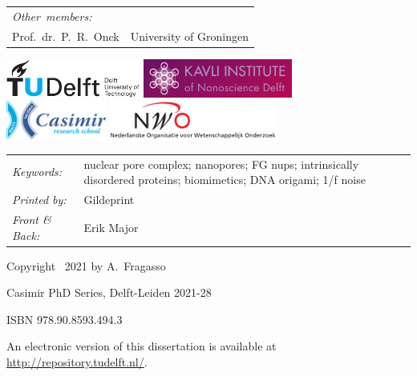 \begin{titlepage}
\begin{tabular}{p{5cm}l}
    \medskip
    \mbox{\emph{Other members:}} & \\
    Prof.\ dr.\ P.\ R.\ Onck & University of Groningen \\
\end{tabular}

\medskip


\vfill
\begin{center}
    \includegraphics[height=0.5in]{title/logos/tudelft}
    \hspace{2em}
    \includegraphics[height=0.5in]{title/logos/kavli_logo_300_dpi} \\[1pt]
    \includegraphics[height=0.5in]{title/logos/casimir}
    \hspace{3.8em}
    \includegraphics[height=0.5in]{title/logos/nwo}
\end{center}
\vfill

\noindent
\begin{tabular}{@{}p{}@{}p{}}
    \textit{Keywords:} & nuclear pore complex; nanopores; FG nups; intrinsically disordered proteins; biomimetics; DNA origami; 1/f noise \\[\medskipamount]
    \textit{Printed by:} & Gildeprint \\[\medskipamount]
    \textit{Front \& Back:} & Erik Major
\end{tabular}

\vspace{4\bigskipamount}

\noindent Copyright \textcopyright\ 2021 by A.~Fragasso
%

\medskip
\noindent Casimir PhD Series, Delft-Leiden 2021-28

\medskip
\noindent ISBN 978.90.8593.494.3

\medskip
\noindent An electronic version of this dissertation is available at \\
\url{http://repository.tudelft.nl/}.

\end{titlepage}

